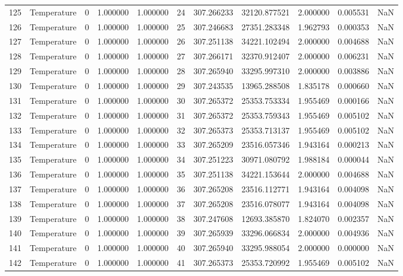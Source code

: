 \begin{tabular}{llrrrrrrrrr}
125 & Temperature & 0 & 1.000000 & 1.000000 & 24 & 307.266233 & 32120.877521 & 2.000000 & 0.005531 & NaN \\
126 & Temperature & 0 & 1.000000 & 1.000000 & 25 & 307.246683 & 27351.283348 & 1.962793 & 0.000353 & NaN \\
127 & Temperature & 0 & 1.000000 & 1.000000 & 26 & 307.251138 & 34221.102494 & 2.000000 & 0.004688 & NaN \\
128 & Temperature & 0 & 1.000000 & 1.000000 & 27 & 307.266171 & 32370.912407 & 2.000000 & 0.006231 & NaN \\
129 & Temperature & 0 & 1.000000 & 1.000000 & 28 & 307.265940 & 33295.997310 & 2.000000 & 0.003886 & NaN \\
130 & Temperature & 0 & 1.000000 & 1.000000 & 29 & 307.243535 & 13965.288508 & 1.835178 & 0.000660 & NaN \\
131 & Temperature & 0 & 1.000000 & 1.000000 & 30 & 307.265372 & 25353.753334 & 1.955469 & 0.000166 & NaN \\
132 & Temperature & 0 & 1.000000 & 1.000000 & 31 & 307.265372 & 25353.759343 & 1.955469 & 0.005102 & NaN \\
133 & Temperature & 0 & 1.000000 & 1.000000 & 32 & 307.265373 & 25353.713137 & 1.955469 & 0.005102 & NaN \\
134 & Temperature & 0 & 1.000000 & 1.000000 & 33 & 307.265209 & 23516.057346 & 1.943164 & 0.000213 & NaN \\
135 & Temperature & 0 & 1.000000 & 1.000000 & 34 & 307.251223 & 30971.080792 & 1.988184 & 0.000044 & NaN \\
136 & Temperature & 0 & 1.000000 & 1.000000 & 35 & 307.251138 & 34221.153644 & 2.000000 & 0.004688 & NaN \\
137 & Temperature & 0 & 1.000000 & 1.000000 & 36 & 307.265208 & 23516.112771 & 1.943164 & 0.004098 & NaN \\
138 & Temperature & 0 & 1.000000 & 1.000000 & 37 & 307.265208 & 23516.078077 & 1.943164 & 0.004098 & NaN \\
139 & Temperature & 0 & 1.000000 & 1.000000 & 38 & 307.247608 & 12693.385870 & 1.824070 & 0.002357 & NaN \\
140 & Temperature & 0 & 1.000000 & 1.000000 & 39 & 307.265939 & 33296.066834 & 2.000000 & 0.004936 & NaN \\
141 & Temperature & 0 & 1.000000 & 1.000000 & 40 & 307.265940 & 33295.988054 & 2.000000 & 0.000000 & NaN \\
142 & Temperature & 0 & 1.000000 & 1.000000 & 41 & 307.265373 & 25353.720992 & 1.955469 & 0.005102 & NaN \\

\end{tabular}
